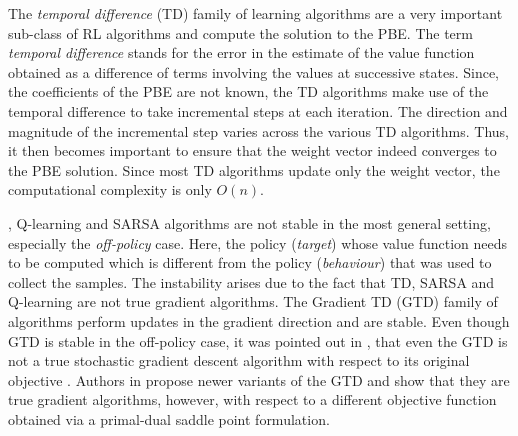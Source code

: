 The \emph{temporal difference} (TD) family of learning algorithms are a very important sub-class of RL algorithms and compute the solution to the PBE. The term \emph{temporal difference} stands for the  error in the estimate of the value function obtained as a difference of terms involving the values at successive states. Since, the coefficients of the PBE are not known, the TD algorithms make use of the temporal difference to take  incremental steps at each iteration. The direction and magnitude of the incremental step varies across the various TD algorithms. Thus, it then becomes important to ensure that the weight vector indeed converges to the PBE solution. Since most TD algorithms update only the weight vector, the computational complexity is only $O(n)$.
\begin{comment}
The issue with TD($0$) is that it makes use of only the current sample and is not sample efficient. This issue was alleviated by the LTSD by making use of all the data to estimate and solve an empirical PBE. Since LSTD involves matrix updates and inversions at each step its computational complexity is minimum $O(n^2)$. In contrast, since simple TD($0$) involves only $O(n)$ computations per step, it continues to be of interest in applications in which cannot afford $O(n^2)$ required by LSTD.\par
\end{comment}
\tdo, Q-learning and SARSA algorithms are not stable in the most general setting, especially the \emph{off-policy} case. Here, the policy (\emph{target}) whose value function needs to be  computed which is different from the policy (\emph{behaviour}) that was used to collect the samples. The instability arises due to the fact that TD, SARSA and Q-learning are not true gradient algorithms. The Gradient TD (GTD) family of algorithms perform updates in the gradient direction and are stable. Even though GTD is stable in the off-policy case, it was pointed out in \cite{}, that even the GTD is not a true stochastic gradient descent algorithm with respect to its original objective \cite{}. Authors in \cite{} propose newer variants of the GTD and show that they are true gradient algorithms, however, with respect to a different objective function obtained via a primal-dual saddle point formulation.\par
